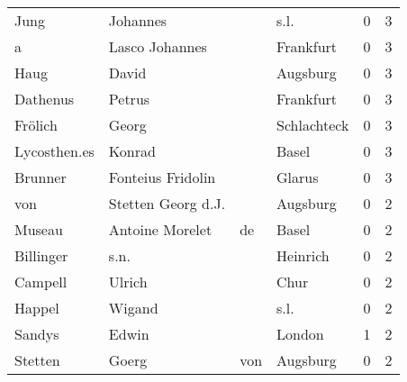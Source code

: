 \begin{tabular}{llllrr}
                     Jung &                           Johannes &             &                                        s.l. &          0 &         3 \\
                        a &                     Lasco Johannes &             &                                   Frankfurt &          0 &         3 \\
                     Haug &                              David &             &                                    Augsburg &          0 &         3 \\
                 Dathenus &                             Petrus &             &                                   Frankfurt &          0 &         3 \\
                  Frölich &                              Georg &             &                                 Schlachteck &          0 &         3 \\
             Lycosthen.es &                             Konrad &             &                                       Basel &          0 &         3 \\
                  Brunner &                  Fonteius Fridolin &             &                                      Glarus &          0 &         3 \\
                      von &                 Stetten Georg d.J. &             &                                    Augsburg &          0 &         2 \\
                   Museau &                    Antoine Morelet &          de &                                       Basel &          0 &         2 \\
                Billinger &                               s.n. &             &                                    Heinrich &          0 &         2 \\
                  Campell &                             Ulrich &             &                                        Chur &          0 &         2 \\
                   Happel &                             Wigand &             &                                        s.l. &          0 &         2 \\
                   Sandys &                              Edwin &             &                                      London &          1 &         2 \\
                  Stetten &                              Goerg &         von &                                    Augsburg &          0 &         2 \\

\end{tabular}
